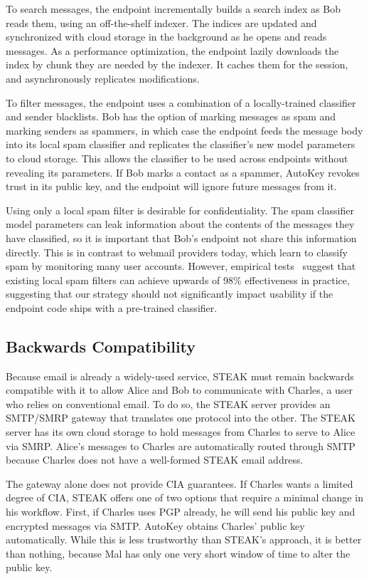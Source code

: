 To search messages, the endpoint incrementally builds a search index as Bob reads them, using an off-the-shelf indexer.  The indices are updated and synchronized with cloud storage in the background as he opens and reads messages.  As a performance optimization, the endpoint lazily downloads the index by chunk they are needed by the indexer.  It caches them for the session, and asynchronously replicates modifications.

To filter messages, the endpoint uses a combination of a locally-trained classifier and sender blacklists.  Bob has the option of marking messages as spam and marking senders as spammers, in which case the endpoint feeds the message body into its local spam classifier and replicates the classifier’s new model parameters to cloud storage.  This allows the classifier to be used across endpoints without revealing its parameters.  If Bob marks a contact as a spammer, AutoKey revokes trust in its public key, and the endpoint will ignore future messages from it.

Using only a local spam filter is desirable for confidentiality.  The spam classifier model parameters can leak information about the contents of the messages they have classified, so it is important that Bob’s endpoint not share this information directly.  This is in contrast to webmail providers today, which learn to classify spam by monitoring many user accounts.  However, empirical tests~\cite{local-spam-filter-eval} suggest that existing local spam filters can achieve upwards of 98\% effectiveness in practice, suggesting that our strategy should not significantly impact usability if the endpoint code ships with a pre-trained classifier.

\subsection{Backwards Compatibility}
Because email is already a widely-used service, STEAK must remain backwards compatible with it to allow Alice and Bob to communicate with Charles, a user who relies on conventional email.  To do so, the STEAK server provides an SMTP/SMRP gateway that translates one protocol into the other.  The STEAK server has its own cloud storage to hold messages from Charles to serve to Alice via SMRP.  Alice’s messages to Charles are automatically routed through SMTP because Charles does not have a well-formed STEAK email address.

The gateway alone does not provide CIA guarantees.  If Charles wants a limited degree of CIA, STEAK offers one of two options that require a minimal change in his workflow.  First, if Charles uses PGP already, he will send his public key and encrypted messages via SMTP.  AutoKey obtains Charles’ public key automatically.  While this is less trustworthy than STEAK’s approach, it is better than nothing, because Mal has only one very short window of time to alter the public key.


